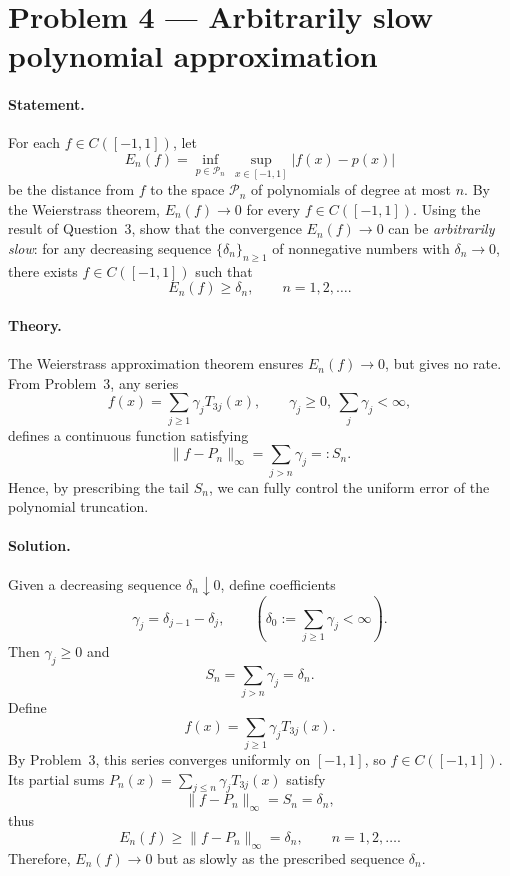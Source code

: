 \documentclass[12pt,a4paper]{article}
\theoremstyle{plain}
\theoremstyle{definition}
\theoremstyle{remark}
\theoremstyle{remark}
\begin{document}
\section*{Problem 4 — Arbitrarily slow polynomial approximation}

\paragraph{Statement.}
For each $f\in C([-1,1])$, let
\[
E_n(f)=\inf_{p\in\mathcal{P}_n}\,\sup_{x\in[-1,1]}|f(x)-p(x)|
\]
be the distance from $f$ to the space $\mathcal{P}_n$ of polynomials of degree at most $n$.
By the Weierstrass theorem, $E_n(f)\to0$ for every $f\in C([-1,1])$.
Using the result of Question~3, show that the convergence $E_n(f)\to0$
can be \emph{arbitrarily slow}: for any decreasing sequence
$\{\delta_n\}_{n\ge1}$ of nonnegative numbers with $\delta_n\to0$,
there exists $f\in C([-1,1])$ such that
\[
E_n(f)\ge\delta_n,\qquad n=1,2,\dots.
\]

\paragraph{Theory.}
The Weierstrass approximation theorem ensures $E_n(f)\to0$, but gives no rate.
From Problem~3, any series
\[
f(x)=\sum_{j\ge1}\gamma_j T_{3j}(x), \qquad \gamma_j\ge0,\ \sum_{j}\gamma_j<\infty,
\]
defines a continuous function satisfying
\[
\|f-P_n\|_\infty=\sum_{j>n}\gamma_j=:S_n.
\]
Hence, by prescribing the tail $S_n$, we can fully control the uniform error of the
polynomial truncation.

\paragraph{Solution.}
Given a decreasing sequence $\delta_n\downarrow0$, define coefficients
\[
\gamma_j=\delta_{j-1}-\delta_j, \qquad (\delta_0:=\sum_{j\ge1}\gamma_j<\infty).
\]
Then $\gamma_j\ge0$ and
\[
S_n=\sum_{j>n}\gamma_j=\delta_n.
\]
Define
\[
f(x)=\sum_{j\ge1}\gamma_j T_{3j}(x).
\]
By Problem~3, this series converges uniformly on $[-1,1]$,
so $f\in C([-1,1])$.
Its partial sums $P_n(x)=\sum_{j\le n}\gamma_jT_{3j}(x)$ satisfy
\[
\|f-P_n\|_\infty=S_n=\delta_n,
\]
thus
\[
E_n(f)\ge\|f-P_n\|_\infty=\delta_n,\qquad n=1,2,\dots.
\]
Therefore, $E_n(f)\to0$ but as slowly as the prescribed sequence $\delta_n$.
\end{document}
